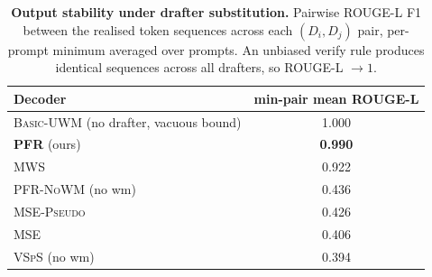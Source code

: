\begin{table}[h]
\centering
\caption{\textbf{Output stability under drafter substitution.}
Pairwise ROUGE-L F1 between the realised token sequences across each
$(D_i,D_j)$ pair, per-prompt minimum averaged over prompts. An unbiased
verify rule produces identical sequences across all drafters, so
ROUGE-L $\to 1$.}
\label{tab:exp2_pairwise_rouge}
\small
\setlength{\tabcolsep}{8pt}
\begin{tabular}{lc}
\toprule
Decoder & min-pair mean ROUGE-L \\
\midrule
\textsc{Basic-UWM} (no drafter, vacuous bound) & 1.000 \\
\textbf{\textsc{PFR}} (ours)                    & \textbf{0.990} \\
\textsc{MWS}                                    & 0.922 \\
\midrule
\textsc{PFR-NoWM} (no wm)                       & 0.436 \\
\textsc{MSE-Pseudo}                             & 0.426 \\
\textsc{MSE}                                    & 0.406 \\
\textsc{VSpS} (no wm)                           & 0.394 \\
\bottomrule
\end{tabular}
\end{table}


